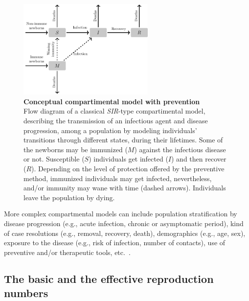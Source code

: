 \begin{figure}[H]
	\centering	
	\includegraphics[width=0.6\textwidth]{Figures/Intro/TikZ_MSIR/MSIR_FlowDiagram}
	\caption[ Conceptual compartimental model with prevention]{%
		{\bf Conceptual compartimental model with prevention}\\
	Flow diagram of a classical \textit{SIR}-type compartimental model, describing the transmission of an infectious agent  and disease progression, among a population by modeling individuals' transitions through different states, during their lifetimes. Some of the newborns may be immunized ($M$) against the infectious disease or not. Susceptible ($S$) individuals get infected ($I$) and then recover ($R$). Depending on the level of protection offered by the preventive method, immunized individuals may get infected, nevertheless, and/or immunity may wane with time (dashed arrows). Individuals leave the population by dying.}
	\label{fig:Intro_MSIR}
\end{figure}
 
More complex compartmental models can include population stratification by disease progression (e.g., acute infection, chronic or asymptomatic period), kind of case resolutions (e.g., removal, recovery, death), demographics (e.g., age, sex), exposure to the disease (e.g., risk of infection, number of contacts), use of preventive and/or therapeutic tools, etc.~\cite[]{Hethcote2000}. 


\subsection{The basic and the effective reproduction numbers}
\label{Intro:ReproductionNumbers}

